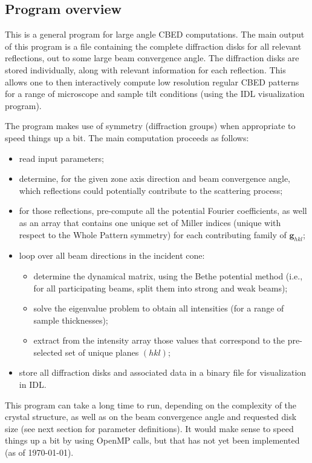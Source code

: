 \documentclass[DIV=calc, paper=letter, fontsize=11pt]{scrartcl}	 %
\begin{document}
\subsection{Program overview\label{sec:f90overviewlacbed}}
This is a general program for large angle CBED computations.  The main output of 
this program is a file containing the complete diffraction disks for all relevant
reflections, out to some large beam convergence angle.  The diffraction disks are stored
individually, along with relevant information for each reflection.  This allows one to
then interactively compute low resolution regular CBED patterns for a range of 
microscope and sample tilt conditions (using the IDL visualization program).

The program makes use of symmetry (diffraction groups) when appropriate to speed 
things up a bit.  The main computation proceeds as follows:
\begin{itemize}
	\item read input parameters;
	\item determine, for the given zone axis direction and beam convergence angle, 
	which reflections could potentially contribute to the scattering process;
	\item for those reflections, pre-compute all the potential Fourier coefficients,
	as well as an array that contains one unique set of Miller indices (unique with respect to the 
	Whole Pattern symmetry) for each 
	contributing family of $\mathbf{g}_{hkl}$;
	\item loop over all beam directions in the incident cone:
	\begin{itemize}
		\item determine the dynamical matrix, using the Bethe potential method (i.e.,
		for all participating beams, split them into strong and weak beams);
		\item solve the eigenvalue problem to obtain all intensities (for a range of 
		sample thicknesses);
		\item extract from the intensity array those values that correspond to the 
		pre-selected set of unique planes $(hkl)$;
	\end{itemize}
	\item store all diffraction disks and associated data in a binary file for visualization in IDL.
\end{itemize}
This program can take a long time to run, depending on the complexity of the crystal structure,
as well as on the beam convergence angle and requested disk size (see next section for parameter 
definitions).  It would make sense to speed things up a bit by using OpenMP calls, but that has not yet
been implemented (as of \today).
\end{document}
